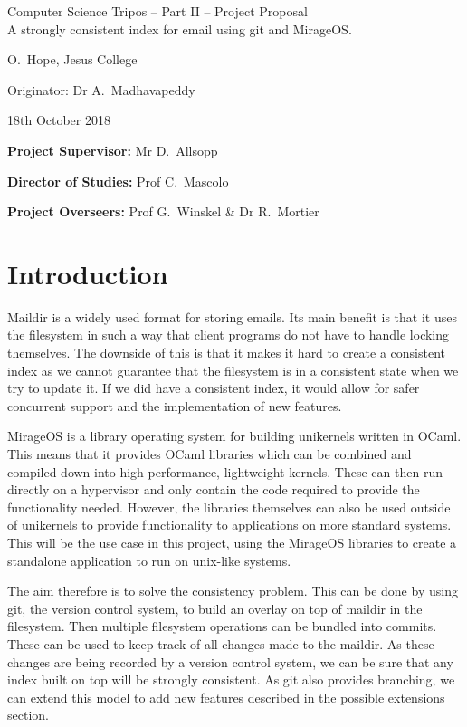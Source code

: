 \documentclass[12pt,a4paper,twoside]{article}
\begin{document}
\begin{center}
    \Large
    Computer Science Tripos -- Part II -- Project Proposal\\[4mm]
    \LARGE
    A strongly consistent index for email using git and MirageOS.

    \large
    O.~Hope, Jesus College

    Originator: Dr A.~Madhavapeddy

    18th October 2018
\end{center}

\vspace{5mm}

\textbf{Project Supervisor:} Mr D.~Allsopp

\textbf{Director of Studies:} Prof C.~Mascolo

\textbf{Project Overseers:} Prof G.~Winskel \& Dr R.~Mortier


\section*{Introduction}

Maildir is a widely used format for storing emails. Its main benefit is that it uses the filesystem in such a way that client programs do not have to handle locking themselves. The downside of this is that it makes it hard to create a consistent index as we cannot guarantee that the filesystem is in a consistent state when we try to update it. If we did have a consistent index, it would allow for safer concurrent support and the implementation of new features.

MirageOS is a library operating system for building unikernels written in OCaml. This means that it provides OCaml libraries which can be combined and compiled down into high-performance, lightweight kernels. These can then run directly on a hypervisor and only contain the code required to provide the functionality needed. However, the libraries themselves can also be used outside of unikernels to provide functionality to applications on more standard systems. This will be the use case in this project, using the MirageOS libraries to create a standalone application to run on unix-like systems.

The aim therefore is to solve the consistency problem. This can be done by using git, the version control system, to build an overlay on top of maildir in the filesystem. Then multiple filesystem operations can be bundled into commits. These can be used to keep track of all changes made to the maildir. As these changes are being recorded by a version control system, we can be sure that any index built on top will be strongly consistent. As git also provides branching, we can extend this model to add new features described in the possible extensions section.
\end{document}
